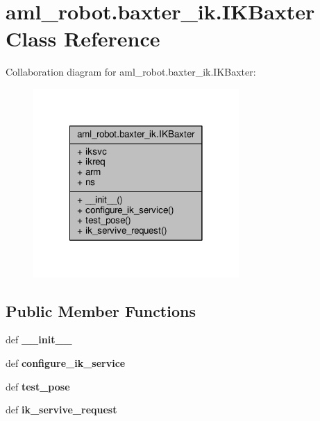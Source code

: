 \hypertarget{classaml__robot_1_1baxter__ik_1_1_i_k_baxter}{\section{aml\-\_\-robot.\-baxter\-\_\-ik.\-I\-K\-Baxter Class Reference}
\label{classaml__robot_1_1baxter__ik_1_1_i_k_baxter}
}


Collaboration diagram for aml\-\_\-robot.\-baxter\-\_\-ik.\-I\-K\-Baxter\-:
\nopagebreak
\begin{figure}[H]
\begin{center}
\leavevmode
\includegraphics[width=222pt]{classaml__robot_1_1baxter__ik_1_1_i_k_baxter__coll__graph}
\end{center}
\end{figure}
\subsection*{Public Member Functions}
\begin{DoxyCompactItemize}
\item 
\hypertarget{classaml__robot_1_1baxter__ik_1_1_i_k_baxter_acdcbd683c692f89daec2685a9ec2e623}{def {\bfseries \-\_\-\-\_\-init\-\_\-\-\_\-}}\label{classaml__robot_1_1baxter__ik_1_1_i_k_baxter_acdcbd683c692f89daec2685a9ec2e623}

\item 
\hypertarget{classaml__robot_1_1baxter__ik_1_1_i_k_baxter_a6985adef358e80b1924292508a707a66}{def {\bfseries configure\-\_\-ik\-\_\-service}}\label{classaml__robot_1_1baxter__ik_1_1_i_k_baxter_a6985adef358e80b1924292508a707a66}

\item 
\hypertarget{classaml__robot_1_1baxter__ik_1_1_i_k_baxter_a87fb9334e61c8d42b4ff2c5e00402b98}{def {\bfseries test\-\_\-pose}}\label{classaml__robot_1_1baxter__ik_1_1_i_k_baxter_a87fb9334e61c8d42b4ff2c5e00402b98}

\item 
\hypertarget{classaml__robot_1_1baxter__ik_1_1_i_k_baxter_a306f472f1d9fd2105c6d42f092bf476c}{def {\bfseries ik\-\_\-servive\-\_\-request}}\label{classaml__robot_1_1baxter__ik_1_1_i_k_baxter_a306f472f1d9fd2105c6d42f092bf476c}

\end{DoxyCompactItemize}
